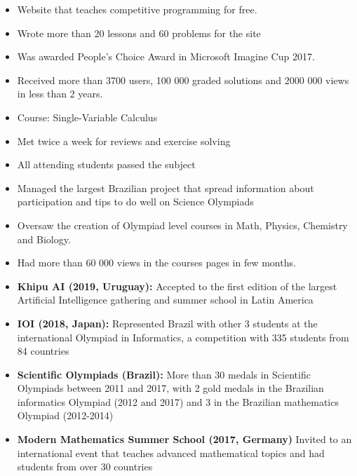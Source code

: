 

\vspace*{23px}
    \begin{itemize}
        \item Website that teaches competitive programming for free.
        \item Wrote more than 20 lessons and 60 problems for the site
    	\item Was awarded People's Choice Award in Microsoft Imagine Cup 2017.
    	\item Received more than 3700 users, 100 000 graded solutions and 2000 000 views in less than 2 years.
    \end{itemize}
\smallskip
{}
    \begin{itemize}
        \item Course: Single-Variable Calculus
        \item Met twice a week for reviews and exercise solving
        \item All attending students passed the subject
    \end{itemize}
\smallskip
{}
    \begin{itemize}
	    \item Managed the largest Brazilian project that spread information about participation and tips to do well on 
	    Science Olympiads 
		\item Oversaw the creation of Olympiad level courses in Math, Physics, Chemistry and Biology.
		\item Had more than 60 000 views in the courses pages in few months.
    \end{itemize}

    \begin{itemize}
        \item \textbf{Khipu AI (2019, Uruguay):} Accepted to the first edition of the largest Artificial Intelligence gathering and summer school in Latin America 
	    \item \textbf{IOI (2018, Japan):} Represented Brazil with other 3 students at the international Olympiad in Informatics, a competition with 335 students from 84 countries
		\item \textbf{Scientific Olympiads (Brazil):} More than 30 medals in Scientific Olympiads between 2011 and 2017, with 2 gold medals in the Brazilian informatics Olympiad (2012 and 2017) and 3 in the Brazilian mathematics Olympiad (2012-2014)
		\item \textbf{Modern Mathematics Summer School (2017, Germany)} Invited to an international event that teaches advanced mathematical topics and had students from over 30 countries
    \end{itemize}

